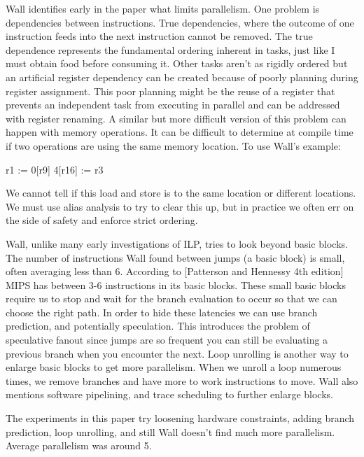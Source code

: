 \documentclass[12pt,twoside,letterpaper]{article}
\begin{document}
Wall identifies early in the paper what limits parallelism. One problem is dependencies between instructions. True dependencies, where the outcome of one instruction feeds into the next instruction cannot be removed. The true dependence represents the fundamental ordering inherent in tasks, just like I must obtain food before consuming it. Other tasks aren't as rigidly ordered but an artificial register dependency can be created because of poorly planning during register assignment. This poor planning might be the reuse of a register that prevents an independent task from executing in parallel and can be addressed with register renaming. A similar but more difficult version of this problem can happen with memory operations. It can be difficult to determine at compile time if two operations are using the same memory location. To use Wall’s example:

\begin{code}
r1 := 0[r9]
4[r16] := r3
\end{code}

We cannot tell if this load and store is to the same location or different locations. We must use alias analysis to try to clear this up, but in practice we often err on the side of safety and enforce strict ordering.

Wall, unlike many early investigations of ILP, tries to look beyond basic blocks. The number of instructions Wall found between jumps (a basic block) is small, often averaging less than 6. According to [Patterson and Hennessy 4th edition] MIPS has between 3-6 instructions in its basic blocks. These small basic blocks require us to stop and wait for the branch evaluation to occur so that we can choose the right path. In order to hide these latencies we can use branch prediction, and potentially speculation. This introduces the problem of speculative fanout since jumps are so frequent you can still be evaluating a previous branch when you encounter the next. Loop unrolling is another way to enlarge basic blocks to get more parallelism. When we unroll a loop numerous times, we remove branches and have more to work instructions to move. Wall also mentions software pipelining, and trace scheduling to further enlarge blocks.

The experiments in this paper try loosening hardware constraints, adding branch prediction, loop unrolling, and still Wall doesn’t find much more parallelism. Average parallelism was around 5.
\end{document}
